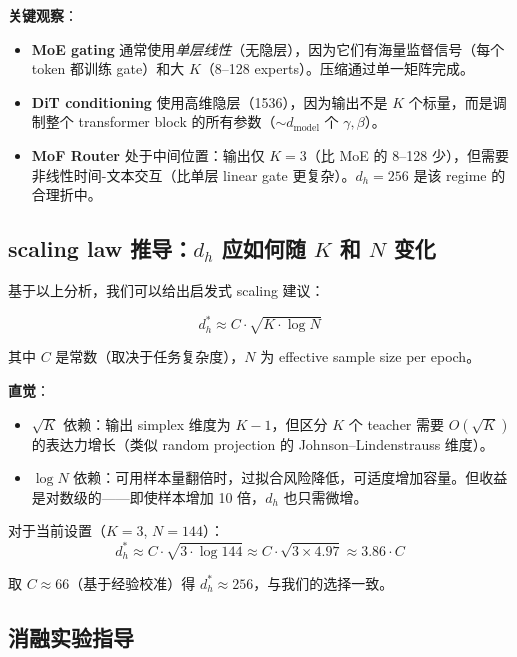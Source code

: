 \documentclass[11pt,a4paper]{article}
\begin{document}
\textbf{关键观察}：
\begin{itemize}
    \item \textbf{MoE gating} 通常使用\emph{单层线性}（无隐层），因为它们有海量监督信号（每个 token 都训练 gate）和大 $K$（8--128 experts）。压缩通过单一矩阵完成。
    \item \textbf{DiT conditioning} 使用高维隐层（1536），因为输出不是 $K$ 个标量，而是调制整个 transformer block 的所有参数（$\sim d_{\text{model}}$ 个 $\gamma, \beta$）。
    \item \textbf{MoF Router} 处于中间位置：输出仅 $K = 3$（比 MoE 的 8--128 少），但需要非线性时间-文本交互（比单层 linear gate 更复杂）。$d_h = 256$ 是该 regime 的合理折中。
\end{itemize}

\subsection{scaling law 推导：$d_h$ 应如何随 $K$ 和 $N$ 变化}

基于以上分析，我们可以给出启发式 scaling 建议：

\begin{equation}
d_h^* \approx C \cdot \sqrt{K \cdot \log N}
\end{equation}

其中 $C$ 是常数（取决于任务复杂度），$N$ 为 effective sample size per epoch。

\textbf{直觉}：
\begin{itemize}
    \item $\sqrt{K}$ 依赖：输出 simplex 维度为 $K{-}1$，但区分 $K$ 个 teacher 需要 $O(\sqrt{K})$ 的表达力增长（类似 random projection 的 Johnson–Lindenstrauss 维度）。
    \item $\log N$ 依赖：可用样本量翻倍时，过拟合风险降低，可适度增加容量。但收益是对数级的——即使样本增加 10 倍，$d_h$ 也只需微增。
\end{itemize}

对于当前设置（$K = 3$, $N = 144$）：
\begin{equation}
d_h^* \approx C \cdot \sqrt{3 \cdot \log 144} \approx C \cdot \sqrt{3 \times 4.97} \approx 3.86 \cdot C
\end{equation}

取 $C \approx 66$（基于经验校准）得 $d_h^* \approx 256$，与我们的选择一致。

\subsection{消融实验指导}
\end{document}
